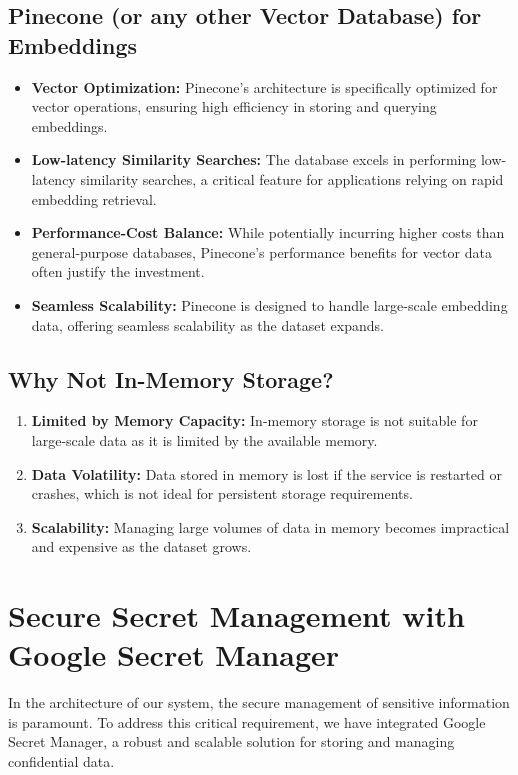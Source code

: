 \documentclass[a4paper, 12pt]{report}
\begin{document}
\subsection{Pinecone (or any other Vector Database) for Embeddings}
\begin{itemize}
    \item \textbf{Vector Optimization:} Pinecone's architecture is specifically optimized for vector operations, ensuring high efficiency in storing and querying embeddings.
    \item \textbf{Low-latency Similarity Searches:} The database excels in performing low-latency similarity searches, a critical feature for applications relying on rapid embedding retrieval.
    \item \textbf{Performance-Cost Balance:} While potentially incurring higher costs than general-purpose databases, Pinecone's performance benefits for vector data often justify the investment.
    \item \textbf{Seamless Scalability:} Pinecone is designed to handle large-scale embedding data, offering seamless scalability as the dataset expands.
\end{itemize}

\subsection{Why Not In-Memory Storage?}
\begin{enumerate}
    \item \textbf{Limited by Memory Capacity:} In-memory storage is not suitable for large-scale data as it is limited by the available memory.
    \item \textbf{Data Volatility:} Data stored in memory is lost if the service is restarted or crashes, which is not ideal for persistent storage requirements.
    \item \textbf{Scalability:} Managing large volumes of data in memory becomes impractical and expensive as the dataset grows.
\end{enumerate}


\section{Secure Secret Management with Google Secret Manager}
In the architecture of our system, the secure management of sensitive information is paramount. To address this critical requirement, we have integrated Google Secret Manager, a robust and scalable solution for storing and managing confidential data.
\end{document}
